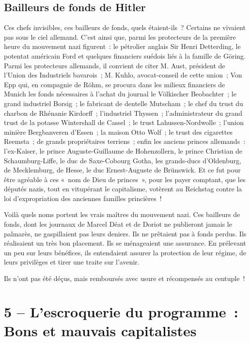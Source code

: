 \documentclass[french,twoside]{book} %
\newcommand\chapteropen{} %
\newcommand\chapterclose{} %
\begin{document}
\section[Bailleurs de fonds de Hitler]{Bailleurs de fonds de Hitler}
\noindent Ces chefs invisibles, ces bailleurs de fonds, quels étaient-ils ? Certains ne vivaient pas sous le ciel allemand. C’est ainsi que, parmi les protecteurs de la première heure du mouvement nazi figurent : le pétrolier anglais Sir Henri Detterding, le potentat américain Ford et quelques financiers suédois liés à la famille de Göring. Parmi les protecteurs allemands, il convient de citer M. Aust, président de l’Union des Industriels bavarois ; M. Kuhlo, avocat-conseil de cette union ; Von Epp qui, en compagnie de Röhm, se procura dans les milieux financiers de Munich les fonds nécessaires à l’achat du journal le Völkischer Beobachter ; le grand industriel Borsig ; le fabricant de dentelle Mutscham ; le chef du trust du charbon de Rhénanie Kirdorff ; l’industriel Thyssen ; l’administrateur du grand trust de la potasse Wintershall de Cassel ; le trust Lahussen-Nordwolle ; l’union minière Bergbanveren d’Essen ; la maison Otto Wolf ; le trust des cigarettes Reemsta ; de grands propriétaires terriens ; enfin les anciens princes allemands : l’ex-Kaiser, le prince Auguste-Guillaume de Hohenzollern, le prince Christian de Schaumburg-Liffe, le duc de Saxe-Cobourg Gotha, les grands-ducs d’Oldenburg, de Mecklemburg, de Hesse, le duc Ernest-Auguste de Brünswick. Et ce fut pour être agréable à ces « nom de Dieu de princes », pour les payer comptant, que les députés nazis, tout en vitupérant le capitalisme, votèrent au Reichstag contre la loi d’expropriation des anciennes familles princières !\par
Voilà quels noms portent les vrais maîtres du mouvement nazi. Ces bailleurs de fonds, dont les journaux de Marcel Déat et de Doriot ne publieront jamais le palmarès, ne gaspillaient pas leurs deniers. Ils ne prêtaient pas à fonds perdus. Ils réalisaient un très bon placement. Ils se ménageaient une assurance. En prélevant un peu sur leurs bénéfices, ils entendaient assurer la protection de leur régime, de leurs privilèges et tirer une traite sur l’avenir.\par
Ils n’ont pas été déçus, mais remboursés avec usure et récompensés au centuple !
\chapterclose


\chapteropen
\chapter[5 – L’escroquerie du programme : Bons et mauvais capitalistes]{5 – L’escroquerie du programme : Bons et mauvais capitalistes}\renewcommand{\leftmark}{5 – L’escroquerie du programme : Bons et mauvais capitalistes}
\end{document}
